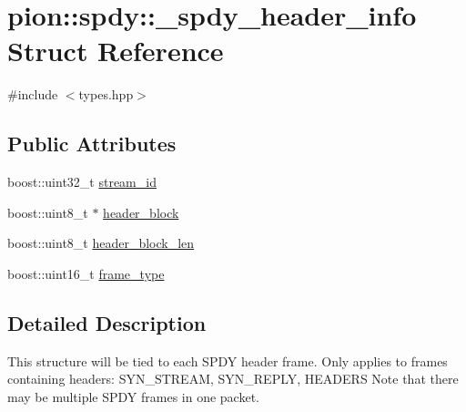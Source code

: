 \hypertarget{structpion_1_1spdy_1_1__spdy__header__info}{\section{pion\-:\-:spdy\-:\-:\-\_\-spdy\-\_\-header\-\_\-info Struct Reference}
\label{structpion_1_1spdy_1_1__spdy__header__info}
}


{\ttfamily \#include $<$types.\-hpp$>$}

\subsection*{Public Attributes}
\begin{DoxyCompactItemize}
\item 
boost\-::uint32\-\_\-t \hyperlink{structpion_1_1spdy_1_1__spdy__header__info_a34f64295be06d0aabaf70142f78e3050}{stream\-\_\-id}
\item 
boost\-::uint8\-\_\-t $\ast$ \hyperlink{structpion_1_1spdy_1_1__spdy__header__info_a04e2da993193a952036d13477114bd0e}{header\-\_\-block}
\item 
boost\-::uint8\-\_\-t \hyperlink{structpion_1_1spdy_1_1__spdy__header__info_a0b5e5f60e357c45af5069d8c7e270028}{header\-\_\-block\-\_\-len}
\item 
boost\-::uint16\-\_\-t \hyperlink{structpion_1_1spdy_1_1__spdy__header__info_afa1a89722edd7a2eda6fd7a15abf7e76}{frame\-\_\-type}
\end{DoxyCompactItemize}


\subsection{Detailed Description}
This structure will be tied to each S\-P\-D\-Y header frame. Only applies to frames containing headers\-: S\-Y\-N\-\_\-\-S\-T\-R\-E\-A\-M, S\-Y\-N\-\_\-\-R\-E\-P\-L\-Y, H\-E\-A\-D\-E\-R\-S Note that there may be multiple S\-P\-D\-Y frames in one packet. 


